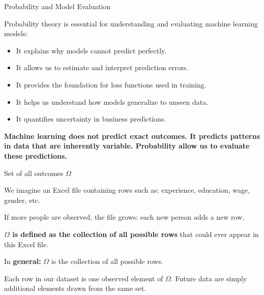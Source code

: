 \documentclass{beamer}
\begin{document}
\begin{frame}{Probability and Model Evaluation}

Probability theory is essential for understanding and evaluating machine learning
models:

\begin{itemize}
    \item It explains why models cannot predict perfectly.
    \item It allows us to estimate and interpret prediction errors.
    \item It provides the foundation for loss functions used in training.
    \item It helps us understand how models generalize to unseen data.
    \item It quantifies uncertainty in business predictions.
\end{itemize}

\medskip

\textbf{Machine learning does not predict exact outcomes.  
It predicts patterns in data that are inherently variable.  
Probability allow us to evaluate these predictions.}

\end{frame}
\begin{frame}{Set of all outcomes $\Omega$}

We imagine an Excel file containing rows such as:
experience, education, wage, gender, etc.

\medskip

If more people are observed, the file grows: each new person adds a new row.

\medskip

\textbf{$\Omega$ is defined as the collection of all possible rows}
that could ever appear in this Excel file.

\medskip

In \textbf{general:} $\Omega$ is the collection of all possible rows. 

\medskip

Each row in our dataset is one observed element of $\Omega$.
Future data are simply additional elements drawn from the same set.

\end{frame}
\end{document}

